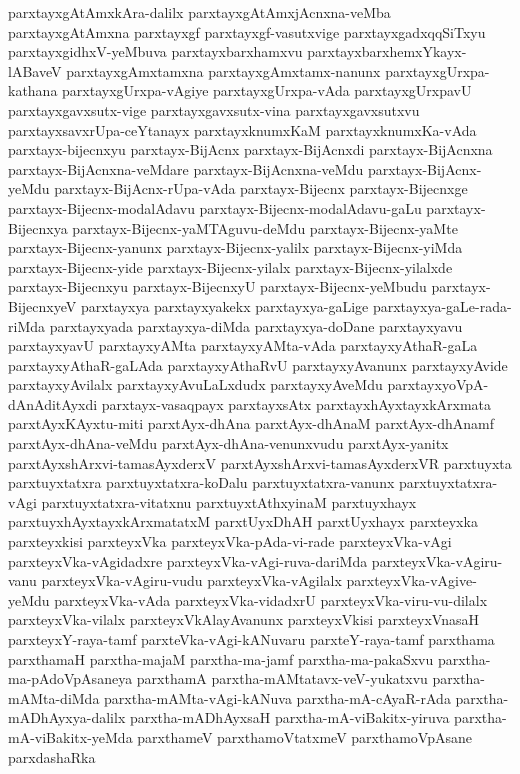 {parxtayxgAtAmxkAra-dalilx
parxtayxgAtAmxjAcnxna-veMba
parxtayxgAtAmxna
parxtayxgf
parxtayxgf-vasutxvige
parxtayxgadxqqSiTxyu
parxtayxgidhxV-yeMbuva
parxtayxbarxhamxvu
parxtayxbarxhemxYkayx-lABaveV
parxtayxgAmxtamxna
parxtayxgAmxtamx-nanunx
parxtayxgUrxpa-kathana
parxtayxgUrxpa-vAgiye
parxtayxgUrxpa-vAda
parxtayxgUrxpavU
parxtayxgavxsutx-vige
parxtayxgavxsutx-vina
parxtayxgavxsutxvu
parxtayxsavxrUpa-ceYtanayx
parxtayxknumxKaM
parxtayxknumxKa-vAda
parxtayx-bijecnxyu
parxtayx-BijAcnx
parxtayx-BijAcnxdi
parxtayx-BijAcnxna
parxtayx-BijAcnxna-veMdare
parxtayx-BijAcnxna-veMdu
parxtayx-BijAcnx-yeMdu
parxtayx-BijAcnx-rUpa-vAda
parxtayx-Bijecnx
parxtayx-Bijecnxge
parxtayx-Bijecnx-modalAdavu
parxtayx-Bijecnx-modalAdavu-gaLu
parxtayx-Bijecnxya
parxtayx-Bijecnx-yaMTAguvu-deMdu
parxtayx-Bijecnx-yaMte
parxtayx-Bijecnx-yanunx
parxtayx-Bijecnx-yalilx
parxtayx-Bijecnx-yiMda
parxtayx-Bijecnx-yide
parxtayx-Bijecnx-yilalx
parxtayx-Bijecnx-yilalxde
parxtayx-Bijecnxyu
parxtayx-BijecnxyU
parxtayx-Bijecnx-yeMbudu
parxtayx-BijecnxyeV
parxtayxya
parxtayxyakekx
parxtayxya-gaLige
parxtayxya-gaLe-rada-riMda
parxtayxyada
parxtayxya-diMda
parxtayxya-doDane
parxtayxyavu
parxtayxyavU
parxtayxyAMta
parxtayxyAMta-vAda
parxtayxyAthaR-gaLa
parxtayxyAthaR-gaLAda
parxtayxyAthaRvU
parxtayxyAvanunx
parxtayxyAvide
parxtayxyAvilalx
parxtayxyAvuLaLxdudx
parxtayxyAveMdu
parxtayxyoVpA-dAnAditAyxdi
parxtayx-vasaqpayx
parxtayxsAtx
parxtayxhAyxtayxkArxmata
parxtAyxKAyxtu-miti
parxtAyx-dhAna
parxtAyx-dhAnaM
parxtAyx-dhAnamf
parxtAyx-dhAna-veMdu
parxtAyx-dhAna-venunxvudu
parxtAyx-yanitx
parxtAyxshArxvi-tamasAyxderxV
parxtAyxshArxvi-tamasAyxderxVR
parxtuyxta
parxtuyxtatxra
parxtuyxtatxra-koDalu
parxtuyxtatxra-vanunx
parxtuyxtatxra-vAgi
parxtuyxtatxra-vitatxnu
parxtuyxtAthxyinaM
parxtuyxhayx
parxtuyxhAyxtayxkArxmatatxM
parxtUyxDhAH
parxtUyxhayx
parxteyxka
parxteyxkisi
parxteyxVka
parxteyxVka-pAda-vi-rade
parxteyxVka-vAgi
parxteyxVka-vAgidadxre
parxteyxVka-vAgi-ruva-dariMda
parxteyxVka-vAgiru-vanu
parxteyxVka-vAgiru-vudu
parxteyxVka-vAgilalx
parxteyxVka-vAgive-yeMdu
parxteyxVka-vAda
parxteyxVka-vidadxrU
parxteyxVka-viru-vu-dilalx
parxteyxVka-vilalx
parxteyxVkAlayAvanunx
parxteyxVkisi
parxteyxVnasaH
parxteyxY-raya-tamf
parxteVka-vAgi-kANuvaru
parxteY-raya-tamf
parxthama
parxthamaH
parxtha-majaM
parxtha-ma-jamf
parxtha-ma-pakaSxvu
parxtha-ma-pAdoVpAsaneya
parxthamA
parxtha-mAMtatavx-veV-yukatxvu
parxtha-mAMta-diMda
parxtha-mAMta-vAgi-kANuva
parxtha-mA-cAyaR-rAda
parxtha-mADhAyxya-dalilx
parxtha-mADhAyxsaH
parxtha-mA-viBakitx-yiruva
parxtha-mA-viBakitx-yeMda
parxthameV
parxthamoVtatxmeV
parxthamoVpAsane
parxdashaRka
}
